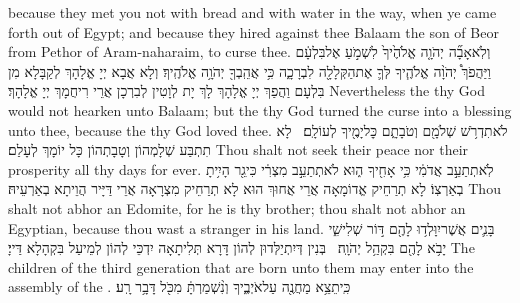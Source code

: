 {because they met you not with bread and with water in the way, when ye came forth out of Egypt; and because they hired against thee Balaam the son of Beor from Pethor of Aram-naharaim, to curse thee.}{}
{וְלֹֽא\maqqaf אָבָ֞ה יְהֹוָ֤ה אֱלֹהֶ֙יךָ֙ לִשְׁמֹ֣עַ אֶל\maqqaf בִּלְעָ֔ם וַיַּהֲפֹךְ֩ יְהֹוָ֨ה אֱלֹהֶ֧יךָ לְּךָ֛ אֶת\maqqaf הַקְּלָלָ֖ה לִבְרָכָ֑ה כִּ֥י אֲהֵֽבְךָ֖ יְהֹוָ֥ה אֱלֹהֶֽיךָ׃}
{וְלָא אֲבָא יְיָ אֱלָהָךְ לְקַבָּלָא מִן בִּלְעָם וַהֲפַךְ יְיָ אֱלָהָךְ לָךְ יָת לְוָטִין לְבִרְכָן אֲרֵי רִיחֲמָךְ יְיָ אֱלָהָךְ׃}
{Nevertheless the \lord\space thy God would not hearken unto Balaam; but the \lord\space thy God turned the curse into a blessing unto thee, because the \lord\space thy God loved thee.}{}
{לֹא\maqqaf תִדְרֹ֥שׁ שְׁלֹמָ֖ם וְטֹבָתָ֑ם כׇּל\maqqaf יָמֶ֖יךָ לְעוֹלָֽם׃ \setuma }
{לָא תִתְבַּע שְׁלָמְהוֹן וְטָבָתְהוֹן כָּל יוֹמָךְ לְעָלַם׃}
{Thou shalt not seek their peace nor their prosperity all thy days for ever.}{}
{לֹֽא\maqqaf תְתַעֵ֣ב אֲדֹמִ֔י כִּ֥י אָחִ֖יךָ ה֑וּא לֹא\maqqaf תְתַעֵ֣ב מִצְרִ֔י כִּי\maqqaf גֵ֖ר הָיִ֥יתָ בְאַרְצֽוֹ׃}
{לָא תְרַחֵיק אֱדוֹמָאָה אֲרֵי אֲחוּךְ הוּא לָא תְרַחֵיק מִצְרָאָה אֲרֵי דַּיָּיר הֲוֵיתָא בְאַרְעֵיהּ׃}
{Thou shalt not abhor an Edomite, for he is thy brother; thou shalt not abhor an Egyptian, because thou wast a stranger in his land.}{}
{בָּנִ֛ים אֲשֶׁר\maqqaf יִוָּלְד֥וּ לָהֶ֖ם דּ֣וֹר שְׁלִישִׁ֑י יָבֹ֥א לָהֶ֖ם בִּקְהַ֥ל יְהֹוָֽה׃ \setuma }
{בְּנִין דְּיִתְיַלְּדוּן לְהוֹן דָּרָא תְּלִיתָאָה יִדְכֵּי לְהוֹן לְמֵיעַל בִּקְהָלָא דַּייָ׃}
{The children of the third generation that are born unto them may enter into the assembly of the \lord.}{}
\newseder
{}%
{כִּֽי\maqqaf תֵצֵ֥א מַחֲנֶ֖ה עַל\maqqaf אֹיְבֶ֑יךָ וְנִ֨שְׁמַרְתָּ֔ מִכֹּ֖ל דָּבָ֥ר רָֽע׃}
